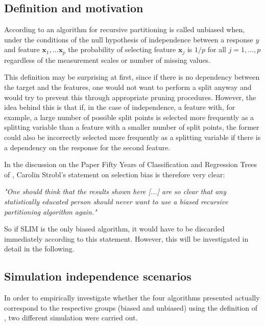 \subsection{Definition and motivation}

According to \citep{Hothorn.2006} an algorithm for recursive partitioning is called unbiased when, under the conditions of the null hypothesis of independence between a response $y$ and feature $\textbf{x}_{1},...\textbf{x}_{p}$ the probability of selecting feature $\textbf{x}_{j}$ is $1/p$ for all $j = 1,...,p$ regardless of the measurement scales or number of missing values. 

This definition may be surprising at first, since if there is no dependency between the target and the features, one would not want to perform a split anyway and would try to prevent this through appropriate pruning procedures.
However, the idea behind this is that if, in the case of independence, a feature with, for example, a large number of possible split points is selected more frequently as a splitting variable than a feature with a smaller number of split points, the former could also be incorrectly selected more frequently as a splitting variable if there is a dependency on the response for the second feature.
\citep{Loh.2014}

In the discussion on the Paper Fifty Years of Classification and Regression Trees of \citep{Loh.2014}, Carolin Strobl's statement on selection bias is therefore very clear:
\vspace{0.5cm}


{\par\centering \textit{"One should think that the results shown here [...] are so clear that any statistically educated person should never
want to use a biased recursive partitioning algorithm again."}\par}
\vspace{0.5cm}

So if SLIM is the only biased algorithm, it would have to be discarded immediately according to this statement. However, this will be investigated in detail in the following.



\subsection{Simulation independence scenarios}
In order to empirically investigate whether the four algorithms presented actually correspond to the respective groups (biased and unbiased) using the definition of \citet{Hothorn.2006}, two different simulation were carried out.

